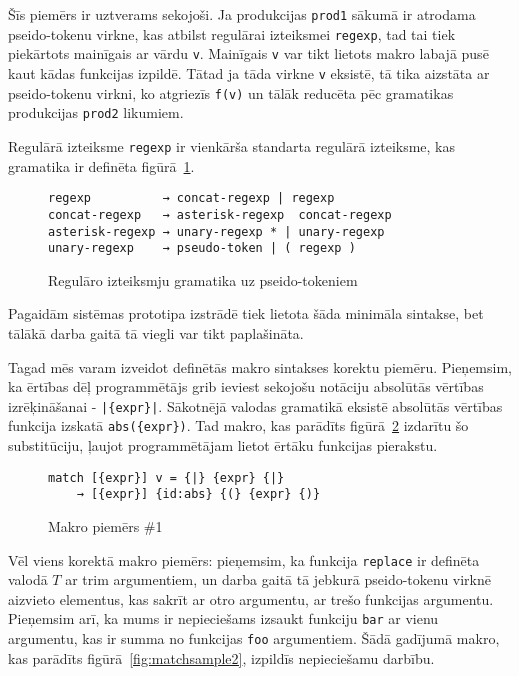 Šīs piemērs ir uztverams sekojoši. Ja produkcijas \verb|prod1| sākumā ir atrodama pseido-tokenu virkne, kas atbilst regulārai izteiksmei \verb|regexp|, tad tai tiek piekārtots mainīgais ar vārdu \verb|v|. Mainīgais \verb|v| var tikt lietots makro labajā pusē kaut kādas funkcijas izpildē. Tātad ja tāda virkne \verb|v| eksistē, tā tika aizstāta ar pseido-tokenu virkni, ko atgriezīs \verb|f(v)|  un tālāk reducēta pēc gramatikas produkcijas \verb|prod2| likumiem. 

Regulārā izteiksme \verb|regexp| ir vienkārša standarta regulārā izteiksme, kas gramatika ir definēta figūrā~\ref{fig:regexpsyntax}.

\begin{figure}[h!]
\begin{verbatim}
regexp          → concat-regexp | regexp
concat-regexp   → asterisk-regexp  concat-regexp
asterisk-regexp → unary-regexp * | unary-regexp
unary-regexp    → pseudo-token | ( regexp )
\end{verbatim}
\caption{\label{fig:regexpsyntax}Regulāro izteiksmju gramatika uz pseido-tokeniem}
\end{figure}

Pagaidām sistēmas prototipa izstrādē tiek lietota šāda minimāla sintakse, bet tālākā darba gaitā tā viegli var tikt paplašināta.

Tagad mēs varam izveidot definētās makro sintakses korektu piemēru. Pieņemsim, ka ērtības dēļ programmētājs grib ieviest sekojošu notāciju absolūtās vērtības izrēķināšanai - \verb/|{expr}|/. Sākotnējā valodas gramatikā eksistē absolūtās vērtības funkcija izskatā \verb|abs({expr})|. Tad makro, kas parādīts figūrā~\ref{fig:matchsample1} izdarītu šo substitūciju, ļaujot programmētājam lietot ērtāku funkcijas pierakstu.

\begin{figure}[h!]
\begin{verbatim}
match [{expr}] v = {|} {expr} {|}
    → [{expr}] {id:abs} {(} {expr} {)}
\end{verbatim}
\caption{\label{fig:matchsample1}Makro piemērs \#1}
\end{figure}

Vēl viens korektā makro piemērs: pieņemsim, ka funkcija \verb|replace| ir definēta valodā $T$ ar trim argumentiem, un darba gaitā tā jebkurā pseido-tokenu virknē aizvieto elementus, kas sakrīt ar otro argumentu, ar trešo funkcijas argumentu. Pieņemsim arī, ka mums ir nepieciešams izsaukt funkciju \verb|bar| ar vienu argumentu, kas ir summa no funkcijas \verb|foo| argumentiem. Šādā gadījumā makro, kas parādīts figūrā~\ref{fig:matchsample2}, izpildīs nepieciešamu darbību.

